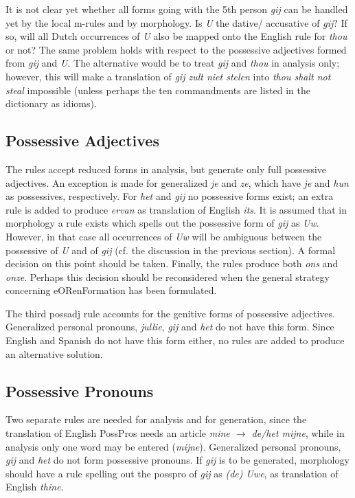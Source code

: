 It is not clear yet whether all forms going with the 5th person {\em gij\/} can 
be handled yet by the local m-rules and by morphology. Is {\em U\/} the dative/
accusative of {\em gij\/}? If so, will all Dutch occurrences of {\em U\/} also 
be mapped onto the English rule for {\em thou\/} or not? The same problem holds 
with respect to the possessive adjectives formed from {\em gij\/} and 
{\em U\/}. The alternative would be to treat {\em gij\/} and {\em thou\/} in 
analysis only; however, this will make a translation of {\em gij zult niet 
stelen\/} into {\em thou shalt not steal\/} impossible (unless perhaps the ten 
commandments are listed in the dictionary as idioms).

\subsection{Possessive Adjectives}

The rules accept reduced forms in analysis, but generate only full possessive 
adjectives. An exception is made for generalized {\em je\/} and {\em ze\/}, 
which have {\em je\/} and {\em hun\/} as possessives, respectively.
For {\em het\/} and {\em gij\/} no possessive forms exist; an extra 
rule is added to produce {\em ervan\/} as translation of English {\em its\/}.
It is assumed that in morphology a rule exists which spells out the possessive 
form of {\em gij\/} as {\em Uw\/}. However, in that case all occurrences of 
{\em Uw\/} will be ambiguous between the possessive of {\em U\/} and of 
{\em gij\/} (cf. the discussion in the previous section). A formal decision on 
this point should be taken. Finally, the rules produce both {\em ons\/} and 
{\em onze\/}. Perhaps this decision should be reconsidered when the general 
strategy concerning eORenFormation has been formulated.

The third possadj rule accounts for the genitive forms of possessive 
adjectives. Generalized personal pronouns, {\em jullie\/}, {\em gij\/} and 
{\em het\/} do not have this form. Since English and Spanish do not have this 
form either, no rules are added to produce an alternative solution.

\subsection{Possessive Pronouns}

Two separate rules are needed for analysis and for generation, since the 
translation of English PossPros needs an article {\em mine $\rightarrow$ de/het
mijne\/}, while in analysis only one word may be entered ({\em mijne\/}).
Generalized personal pronouns, {\em gij\/} and {\em het\/} do not form 
possessive pronouns. If {\em gij\/} is to be generated, morphology should have 
a rule spelling out the posspro of {\em gij\/} as {\em (de) Uwe\/}, as 
translation of English {\em thine\/}. 

